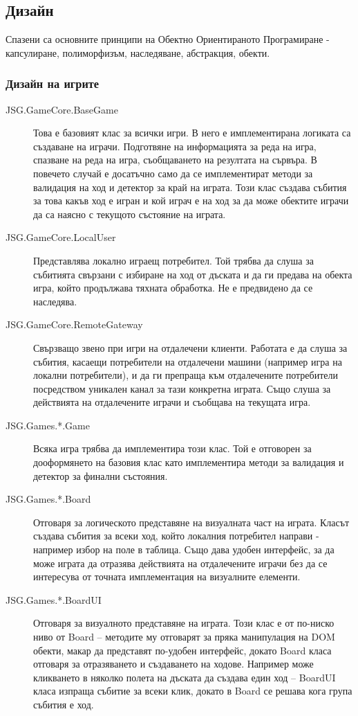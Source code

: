 \documentclass[a4paper]{article}
\begin{document}
\subsection{Дизайн} 
Спазени са основните принципи на Обектно Ориентираното Програмиране \cite{oop} - капсулиране, полиморфизъм, наследяване, абстракция, обекти.

  \subsubsection{Дизайн на игрите}
  
    \begin{description}
      \item[JSG.GameCore.BaseGame] Това е базовият клас за всички игри. В него е имплементирана логиката са създаване на играчи. Подготвяне на информацията за реда на игра, спазване на реда на игра, съобщаването на резултата на сървъра. В повечето случай е досатъчно само да се имплементират методи за валидация на ход и детектор за край на играта. Този клас създава събития за това какъв ход е игран и кой играч е на ход за да може обектите играчи да са наясно с текущото състояние на играта.
      \item[JSG.GameCore.LocalUser] Представлява локално играещ потребител. Той трябва да слуша за събитията свързани с избиране на ход от дъската и да ги предава на обекта игра, който продължава тяхната обработка. Не е предвидено да се наследява.
      \item[JSG.GameCore.RemoteGateway] Свързващо звено при игри на отдалечени клиенти. Работата е да слуша за събития, касаещи потребители на отдалечени машини (например игра на локални потребители), и да ги препраща към отдалечените потребители посредством уникален канал за тази конкретна играта. Също слуша за действията на отдалечените играчи и съобщава на текущата игра.
      \item[JSG.Games.*.Game] Всяка игра трябва да имплементира този клас. Той е отговорен за дооформянето на базовия клас като имплементира методи за валидация и детектор за финални състояния.
      \item[JSG.Games.*.Board] Отговаря за логическото представяне на визуалната част на играта. Класът създава събития за всеки ход, който локалния потребител направи - например избор на поле в таблица. Също дава удобен интерфейс, за да може играта да отразява действията на отдалечените играчи без да се интересува от точната имплементация на визуалните елементи.
      \item[JSG.Games.*.BoardUI] Отговаря за визуалното представяне на играта. Този клас е от по-ниско ниво от Board -- методите му отговарят за пряка манипулация на DOM обекти, макар да представят по-удобен интерфейс, докато Board класа отговаря за отразяването и създаването на ходове. Например може кликването в няколко полета на дъската да създава един ход -- BoardUI класа изпраща събитие за всеки клик, докато в Board се решава кога група събития е ход.

\end{description}
\end{document}
